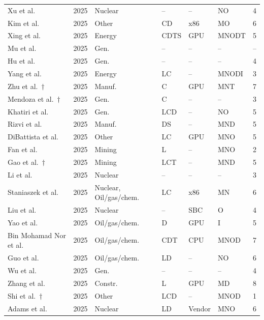 \begin{longtable}{lllllll}
Xu et al.~\cite{inc:paper011} & 2025 & Nuclear & -- & -- & NO & 4\\
Kim et al.~\cite{inc:paper058} & 2025 & Other & CD & x86 & MO & 6\\
Xing et al.~\cite{inc:paper028} & 2025 & Energy & CDTS & GPU & MNODT & 5\\
Mu et al.~\cite{inc:paper043} & 2025 & Gen. & -- & -- & -- & --\\
Hu et al.~\cite{inc:paper010} & 2025 & Gen. & -- & -- & -- & 4\\
Yang et al.~\cite{inc:paper016} & 2025 & Energy & LC & -- & MNODI & 3\\
Zhu et al.~\cite{inc:paper020}$\dagger$ & 2025 & Manuf. & C & GPU & MNT & 7\\
Mendoza et al.~\cite{inc:paper024}$\dagger$ & 2025 & Gen. & C & -- & -- & 3\\
Khatiri et al.~\cite{inc:paper031} & 2025 & Gen. & LCD & -- & NO & 5\\
Rizvi et al.~\cite{inc:paper029} & 2025 & Manuf. & DS & -- & MND & 5\\
DiBattista et al.~\cite{inc:paper051} & 2025 & Other & LC & GPU & MNO & 5\\
Fan et al.~\cite{inc:paper004} & 2025 & Mining & L & -- & MNO & 2\\
Gao et al.~\cite{inc:paper017}$\dagger$ & 2025 & Mining & LCT & -- & MND & 5\\
Li et al.~\cite{inc:paper009} & 2025 & Nuclear & -- & -- & -- & 3\\
Staniaszek et al.~\cite{inc:paper045} & 2025 & Nuclear, Oil/gas/chem. & LC & x86 & MN & 6\\
Liu et al.~\cite{inc:paper050} & 2025 & Nuclear & -- & SBC & O & 4\\
Yao et al.~\cite{inc:paper001} & 2025 & Oil/gas/chem. & D & GPU & I & 5\\
Bin Mohamad Nor et al.~\cite{inc:paper002} & 2025 & Oil/gas/chem. & CDT & CPU & MNOD & 7\\
Guo et al.~\cite{inc:paper034} & 2025 & Oil/gas/chem. & LD & -- & NO & 6\\
Wu et al.~\cite{inc:paper054} & 2025 & Gen. & -- & -- & -- & 4\\
Zhang et al.~\cite{inc:paper060} & 2025 & Constr. & L & GPU & MD & 8\\
Shi et al.~\cite{inc:paper022}$\dagger$ & 2025 & Other & LCD & -- & MNOD & 1\\
Adams et al.~\cite{inc:r2-0704} & 2025 & Nuclear & LD & Vendor & MNO & 6\\

\end{longtable}

